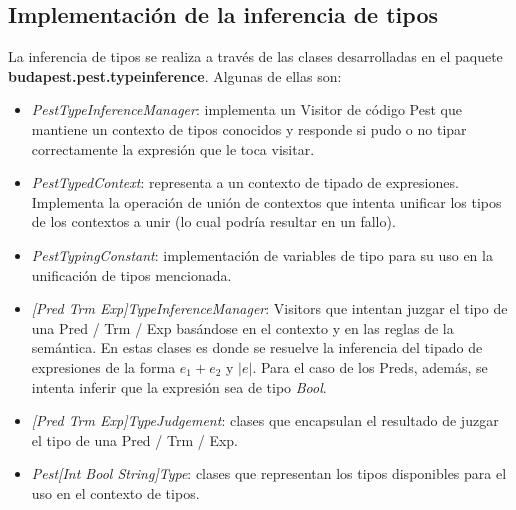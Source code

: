 \documentclass[a4paper]{article}
\begin{document}
\subsection{Implementación de la inferencia de tipos}

La inferencia de tipos se realiza a través de las clases desarrolladas en el paquete \textbf{budapest.pest.typeinference}. Algunas de ellas son:

\begin{itemize}
\item \emph{PestTypeInferenceManager}: implementa un Visitor de código Pest que mantiene un contexto de tipos conocidos y responde si pudo o no tipar correctamente la expresión que le toca visitar.
\item \emph{PestTypedContext}: representa a un contexto de tipado de expresiones.  Implementa la operación de unión de contextos que intenta unificar los tipos de los contextos a unir (lo cual podría resultar en un fallo).
\item \emph{PestTypingConstant}: implementación de variables de tipo para su uso en la unificación de tipos mencionada.
\item \emph{[Pred Trm Exp]TypeInferenceManager}: Visitors que intentan juzgar el tipo de una Pred / Trm / Exp basándose en el contexto y en las reglas de la semántica. En estas clases es donde se resuelve la inferencia del tipado de expresiones de la forma $e_1 + e_2$ y $|e|$. Para el caso de los Preds, además, se intenta inferir que la expresión sea de tipo \emph{Bool}. 
\item \emph{[Pred Trm Exp]TypeJudgement}: clases que encapsulan el resultado de juzgar el tipo de una Pred / Trm / Exp.
\item \emph{Pest[Int Bool String]Type}: clases que representan los tipos disponibles para el uso en el contexto de tipos.
\end{itemize}
\end{document}
